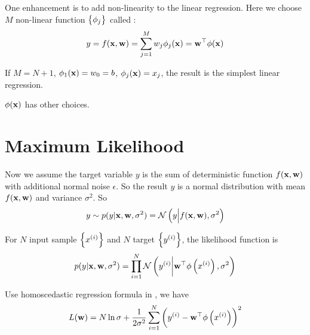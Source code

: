 One enhancement is to add non-linearity to the linear regression. Here we choose $M$ non-linear function $\set{\phi_j}$ called :
\begin{equation}
    y = f(\mathbf{x}, \mathbf{w}) = \sum_{j=1}^M w_j \phi_j (\mathbf{x}) = {\mathbf{w}}^\top \phi(\mathbf{x})
\end{equation}

If $M = N+1$, $\phi_1(\mathbf{x}) = w_0 = b$, $\phi_j(\mathbf{x}) = {x}_{j}$, the result is the simplest linear regression.

$\phi(\mathbf{x})$ has other choices.




\section{Maximum Likelihood}

Now we assume the target variable $y$ is the sum of deterministic function $f(\mathbf{x}, \mathbf{w})$ with additional normal noise $\epsilon$. So the result $y$ is a normal distribution with mean $f(\mathbf{x}, \mathbf{w})$ and variance $\sigma^2$. So
\begin{equation}
    y \sim p(y|\mathbf{x}, \mathbf{w}, \sigma^2) = \mathcal{N}\left(y \middle| f(\mathbf{x}, \mathbf{w}),\sigma^2\right)
\end{equation}

For $N$ input sample $\set{{x}^{(i)}}$ and $N$ target $\set{{y}^{(i)}}$, the likelihood function is
\begin{equation}
    p(y|\mathbf{x}, \mathbf{w}, \sigma^2) = \prod_{i=1}^N \mathcal{N}\left({y}^{(i)} \middle| {\mathbf{w}}^\top \phi\left({x}^{(i)}\right),\sigma^2\right)
\end{equation}

Use homoscedastic regression formula in , we have 
\begin{equation}\label{loss_function_of_linear_regression}
    L(\mathbf{w}) = N \ln \sigma + \frac{1}{2\sigma^2} \sum_{i=1}^N \left( {y}^{(i)} - {\mathbf{w}}^\top \phi\left({x}^{(i)}\right) \right)^2
\end{equation}

